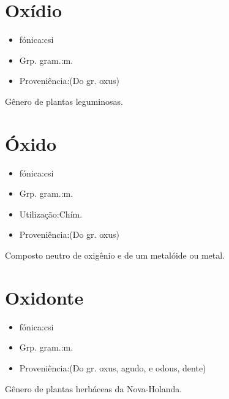 \section{Oxídio}
\begin{itemize}
\item {fónica:csi}
\end{itemize}
\begin{itemize}
\item {Grp. gram.:m.}
\end{itemize}
\begin{itemize}
\item {Proveniência:(Do gr. \textunderscore oxus\textunderscore )}
\end{itemize}
Gênero de plantas leguminosas.
\section{Óxido}
\begin{itemize}
\item {fónica:csi}
\end{itemize}
\begin{itemize}
\item {Grp. gram.:m.}
\end{itemize}
\begin{itemize}
\item {Utilização:Chím.}
\end{itemize}
\begin{itemize}
\item {Proveniência:(Do gr. \textunderscore oxus\textunderscore )}
\end{itemize}
Composto neutro de oxigênio e de um metalóide ou metal.
\section{Oxidonte}
\begin{itemize}
\item {fónica:csi}
\end{itemize}
\begin{itemize}
\item {Grp. gram.:m.}
\end{itemize}
\begin{itemize}
\item {Proveniência:(Do gr. \textunderscore oxus\textunderscore , agudo, e \textunderscore odous\textunderscore , dente)}
\end{itemize}
Gênero de plantas herbáceas da Nova-Holanda.
